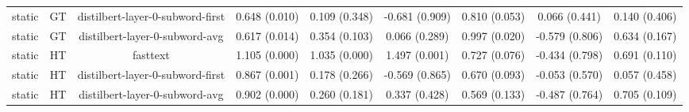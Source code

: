 \begin{sidewaystable}[htb]
\begin{tabular}{@{}ccccccccc@{}}
        static & GT & distilbert-layer-0-subword-first & 0.648 (0.010) & 0.109 (0.348) & -0.681 (0.909) & 0.810 (0.053) & 0.066 (0.441) & 0.140 (0.406) \\
        static & GT & distilbert-layer-0-subword-avg & 0.617 (0.014) & 0.354 (0.103) & 0.066 (0.289) & 0.997 (0.020) & -0.579 (0.806) & 0.634 (0.167) \\
        static & HT & fasttext & 1.105 (0.000) & 1.035 (0.000) & 1.497 (0.001) & 0.727 (0.076) & -0.434 (0.798) & 0.691 (0.110) \\
        static & HT & distilbert-layer-0-subword-first & 0.867 (0.001) & 0.178 (0.266) & -0.569 (0.865) & 0.670 (0.093) & -0.053 (0.570) & 0.057 (0.458) \\
        static & HT & distilbert-layer-0-subword-avg & 0.902 (0.000) & 0.260 (0.181) & 0.337 (0.428) & 0.569 (0.133) & -0.487 (0.764) & 0.705 (0.109) \\
        \bottomrule
    \end{tabular}
\end{sidewaystable}